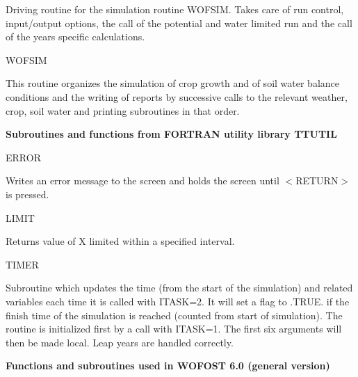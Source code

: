 \documentclass[11pt]{article}
\begin{document}
\begin{indenting}{5.08cm}
Driving routine for the simulation routine WOFSIM. Takes
care of run control, input/output options, the call of the
potential and water limited run and the call of the years
specific calculations.
\end{indenting}
WOFSIM
\testlastline

\begin{indenting}{5.08cm}
This routine organizes the simulation of crop growth and of
soil water balance conditions and the writing of reports by
successive calls to the relevant weather, crop, soil water and
printing subroutines in that order.
\end{indenting}

\bigskip
\bigskip
\bigskip
\bigskip
\bigskip
{\bf {\large Subroutines and functions from FORTRAN utility library TTUTIL}}

ERROR
\testlastline

\begin{indenting}{5.08cm}
Writes an error message to the screen and holds the screen
until $<$RE\-TURN$>$ is pressed.\hfill  
\end{indenting}
LIMIT
\testlastline

\begin{indenting}{5.08cm}
Returns value of X limited within a specified interval.\hfill  
\end{indenting}
TIMER
\testlastline

\begin{indenting}{5.08cm}
Subroutine which updates the time (from the start of the
simula\-tion) and related variables each time it is called with
ITASK=2. It will set a flag to .TRUE. if the finish time of
the simulation is reached (counted from start of simulation).
The routine is initialized first by a call with ITASK=1. The
first six arguments will then be made local. Leap years are
handled correctly.\hfill  
\end{indenting}

\bigskip
\bigskip
\bigskip
{\bf {\large Functions and subroutines used in WOFOST 6.0 (general version)}}
\end{document}
